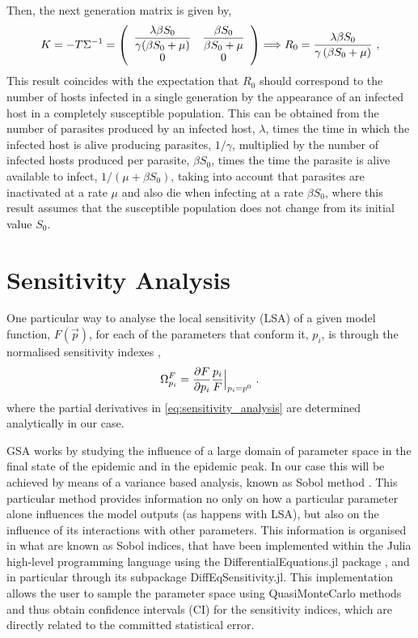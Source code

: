 Then, the next generation matrix is given by,
\begin{equation*}
    K=- T\Sigma^{-1}=\left(\begin{array}{cc}
            \displaystyle \frac{\lambda\beta S_0}{\gamma(\beta S_0 + \mu)} &
            \displaystyle \frac{\beta S_0}{\beta S_0 + \mu}
            \\
            0                                                              & 0
        \end{array}\right) \Longrightarrow R_0=\frac{\lambda \beta
        S_0}{\gamma\left(\beta S_0+\mu\right)} \ ,
\end{equation*}
This result coincides with the expectation that $R_0$ should correspond to the
number of  hosts infected in a single generation by the appearance of an
infected host in a completely susceptible population. This can be obtained from
the number of parasites produced by an infected host, $\lambda$, times the time
in which the infected host is alive producing parasites, $1/\gamma$, multiplied
by the number of infected hosts produced per parasite, $\beta S_0$, times the
time the parasite is alive available to infect, $1/(\mu+\beta S_0)$, taking
into account that parasites are inactivated at a rate $\mu$ and also die when
infecting at a rate $\beta S_0$, where this result assumes that the susceptible
population does not change from its initial value $S_0$.

\section{Sensitivity Analysis} \label{app:sensanal}

One particular way to analyse the local sensitivity (LSA) of a given model
function, $F(\vec{p})$, for each of the parameters that conform it, $p_i$, is
through the normalised sensitivity indexes \cite{sensitivity_analysis},
\begin{equation}\label{eq:sensitivity_analysis}
    \Omega_{p_i}^{F}=\frac{\partial F}{\partial p_i}\frac{p_i}{F}\Big|_{p_i=p^0}^{} \
    .
\end{equation}
where the partial derivatives in \cref{eq:sensitivity_analysis} are
determined analytically in our case.

GSA works by studying the influence of a large domain of parameter space in
the final state of the epidemic and in the epidemic peak.
In our case this will be achieved by means of a variance based analysis,
known as Sobol method \cite{SOBOL2001271}. This particular method provides
information no only on how a particular parameter alone influences the model
outputs (as happens with LSA), but also on the influence of its interactions
with other parameters. This information is organised in what are known as Sobol
indices, that have been
implemented within the Julia high-level programming language \cite{julia}
using the DifferentialEquations.jl package \cite{DifferentialEquations.jl},
and in particular through its subpackage DiffEqSensitivity.jl. This
implementation allows the user to sample the parameter space using
QuasiMonteCarlo methods and thus obtain confidence intervals (CI) for the
sensitivity indices, which are directly related to the committed statistical
error.

